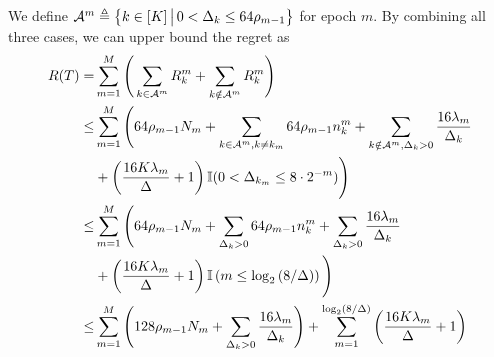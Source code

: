 We define ${\mathcal{A}}^m\triangleq\left\{ k\in[K]\,\big|\,0<\Delta_k\le 64\rho_{m-1} \right\}$ for epoch $m$. By combining all three cases, we can upper bound the regret as
\begin{equation}\label{eq:sog-mab-regret}
\begin{split}
R(T)=&\sum_{m=1}^M\Bigg(\sum_{k \in \mathcal{A}^m} R_k^m + \sum_{k \notin \mathcal{A}^m} R_k^m\Bigg)\\    
\le& \sum_{m=1}^M\Bigg( 64\rho_{m-1}N_m+\sum_{k \in \mathcal{A}^m,k\neq k_m} 64\rho_{m-1}n_k^m + \sum_{k \notin \mathcal{A}^m, \Delta_k>0} \frac{16\lambda_m}{\Delta_k}\\
&+ \left(\frac{16K\lambda_m}{\Delta} + 1\right){\mathbb{I}}(0<\Delta_{k_m} \le 8 \cdot 2^{-m}) \Bigg)\\ 
\le& \sum_{m=1}^M\Bigg( 64\rho_{m-1}N_m+\sum_{\Delta_k>0} 64\rho_{m-1}n_k^m + \sum_{\Delta_k>0} \frac{16\lambda_m}{\Delta_k}\\
&+ \left(\frac{16K\lambda_m}{\Delta} + 1\right){\mathbb{I}}\left(m\le \log_2\left(8/\Delta\right)\right)\Bigg)\\ 
\le& \sum_{m=1}^M\Bigg( 128\rho_{m-1}N_m + \sum_{\Delta_k>0} \frac{16\lambda_m}{\Delta_k}\Bigg)+ \sum_{m=1}^{\log_2(8/\Delta)}\left(\frac{16K\lambda_m}{\Delta} + 1\right)
\end{split}
\end{equation}

